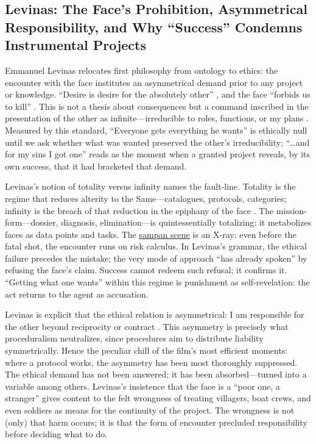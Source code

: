 \subsection*{Levinas: The Face's Prohibition, Asymmetrical Responsibility, and Why
	``Success'' Condemns Instrumental Projects}
\label{ssec:iii-levinas}
Emmanuel Levinas relocates first philosophy from ontology to ethics: the encounter with the face
institutes an asymmetrical demand prior to any project or knowledge. ``Desire is desire for the
absolutely other'' \parencite[p.~33]{LevinasTI1969}, and the face ``forbids us to kill''
\parencite[p.~199]{LevinasTI1969}. This is not a thesis about consequences but a command
inscribed in the presentation of the other as infinite—irreducible to roles, functions, or my
plans \parencite[pp.~194--201]{LevinasTI1969}. Measured by this standard, ``Everyone gets
everything he wants'' is ethically null until we ask whether what was wanted preserved the
other's irreducibility; ``\ldots and for my sins I got one'' reads as the moment when a granted
project reveals, by its own success, that it had bracketed that demand.

Levinas's notion of totality versus infinity names the fault-line. Totality is the regime that
reduces alterity to the Same—catalogues, protocols, categories; infinity is the breach of that
reduction in the epiphany of the face \parencite[pp.~21--24, 33--36]{LevinasTI1969}. The
mission-form—dossier, diagnosis, elimination—is quintessentially totalizing: it metabolizes
faces as data points and tasks. The \hyperref[scene:sampan]{sampan scene} is an X-ray: even
before the fatal shot, the encounter runs on risk calculus. In Levinas's grammar, the ethical
failure precedes the mistake; the very mode of approach ``has already spoken'' by refusing the
face's claim. Success cannot
redeem such refusal; it confirms it. ``Getting what one wants'' within this regime is punishment
as self-revelation: the act returns to the agent as accusation.

Levinas is explicit that the ethical relation is asymmetrical: I am responsible for the other
beyond reciprocity or contract \parencite[pp.~215--219]{LevinasTI1969}. This asymmetry is
precisely what proceduralism neutralizes, since procedures aim to distribute liability
symmetrically. Hence the peculiar chill of the film's most efficient moments: where a protocol
works, the asymmetry has been most thoroughly suppressed. The ethical demand has not been
answered; it has been absorbed—turned into a variable among others. Levinas's insistence that
the face is a ``poor one, a stranger'' \parencite[p.~213]{LevinasTI1969} gives content to the
felt wrongness of treating villagers, boat crews, and even soldiers as means for the continuity
of the project. The wrongness is not (only) that harm occurs; it is that the form of encounter
precluded responsibility before deciding what to do.


